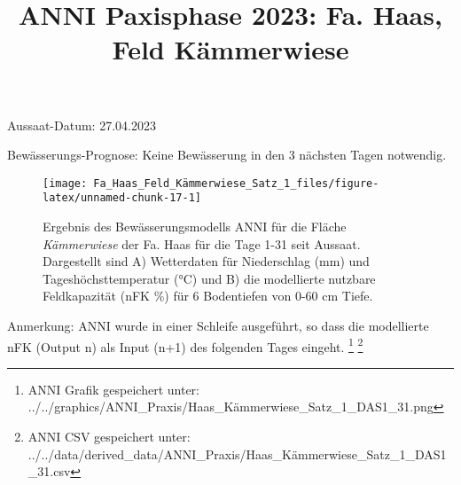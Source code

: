 \documentclass[
]{article}
\title{ANNI Paxisphase 2023: Fa. Haas, Feld Kämmerwiese}
\author{}
\date{\vspace{-2.5em}}
\begin{document}
\maketitle

Aussaat-Datum: 27.04.2023

Bewässerungs-Prognose: Keine Bewässerung in den 3 nächsten Tagen
notwendig.

\hfill\break

\begin{figure}[H]
\texttt{[image: Fa\_Haas\_Feld\_Kämmerwiese\_Satz\_1\_files/figure-latex/unnamed-chunk-17-1]} \caption{Ergebnis des Bewässerungsmodells ANNI für die Fläche \textit{Kämmerwiese} der Fa. Haas für die Tage 1-31 seit Aussaat. Dargestellt sind A) Wetterdaten für Niederschlag (mm) und Tageshöchsttemperatur (°C) und B) die modellierte nutzbare Feldkapazität (nFK \%) für 6 Bodentiefen von 0-60 cm Tiefe.}\label{fig:unnamed-chunk-17}
\end{figure}

Anmerkung: ANNI wurde in einer Schleife ausgeführt, so dass die
modellierte nFK (Output n) als Input (n+1) des folgenden Tages eingeht.
\footnote{ANNI Grafik gespeichert unter:
  ../../graphics/ANNI\_Praxis/Haas\_Kämmerwiese\_Satz\_1\_DAS1\_31.png}
\footnote{ANNI CSV gespeichert unter:
  ../../data/derived\_data/ANNI\_Praxis/Haas\_Kämmerwiese\_Satz\_1\_DAS1\_31.csv}
\end{document}
